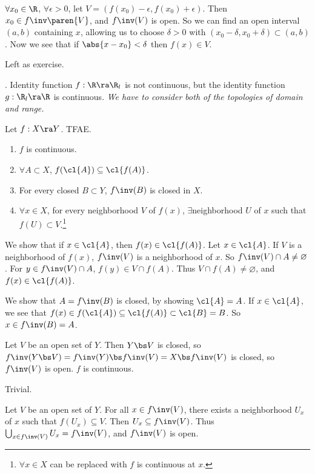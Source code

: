 \note{\mimp} \(\forall x_0 \in \R\), \(\forall \epsilon > 0\), let \(V = (f(x_0) - \epsilon, f(x_0) + \epsilon)\). Then \(x_0 \in f\inv\paren{V}\), and \(f\inv(V)\) is open. So we can find an open interval \((a, b)\) containing \(x\), allowing us to choose \(\delta > 0\) with \((x_0 - \delta, x_0 + \delta) \subset (a, b)\). Now we see that if \(\abs{x - x_0} < \delta\) then \(f(x) \in V\).

\note{\mimpd} Left as exercise.

\ex. Identity function \(f : \R \ra \R_l\) is not continuous, but the identity function \(g: \R_l \ra \R\) is continuous. \textit{We have to consider both of the topologies of domain and range.}

\pagebreak

 Let \(f : X \ra Y\). TFAE.
\begin{enumerate}
    \item \(f\) is continuous.
    \item \(\forall A \subset X\), \(f(\cl{A}) \subseteq \cl{f(A)}\).
    \item For every closed \(B \subset Y\), \(f\inv(B)\) is closed in \(X\).
    \item \(\forall x \in X\), for every neighborhood \(V\) of \(f(x)\),   \(\exists\)neighborhood \(U\) of \(x\) such that \(f(U) \subset V\).\footnote{\(\forall x \in X\) can be replaced with \(f\) is continuous at \(x\).}
\end{enumerate}

\pf

 We show that if \(x \in \cl{A}\), then \(f(x) \in \cl{f(A)}\). Let \(x \in \cl{A}\). If \(V\) is a neighborhood of \(f(x)\), \(f\inv(V)\) is a neighborhood of \(x\). So \(f\inv(V) \cap A \neq \varnothing\). For \(y \in f\inv(V) \cap A\), \(f(y) \in V \cap f(A)\). Thus \(V \cap f(A) \neq \varnothing\), and \(f(x) \in \cl{f(A)}\).

 We show that \(A = f\inv(B)\) is closed, by showing \(\cl{A} = A\). If \(x \in \cl{A}\), we see that \(f(x) \in f(\cl{A}) \subseteq \cl{f(A)} \subset \cl{B} = B\). So \(x \in f\inv(B) = A\).

 Let \(V\) be an open set of \(Y\). Then \(Y \bs V\) is closed, so \(f\inv(Y \bs V) = f\inv(Y) \bs f\inv(V) = X \bs f\inv(V)\) is closed, so \(f\inv(V)\) is open. \(f\) is continuous.

 Trivial.

 Let \(V\) be an open set of \(Y\). For all \(x \in f\inv(V)\), there exists a neighborhood \(U_x\) of \(x\) such that \(f(U_x) \subseteq V\). Then \(U_x \subseteq f\inv(V)\). Thus \(\bigcup_{x \in f\inv(V)} U_x = f\inv(V)\), and \(f\inv(V)\) is open.

